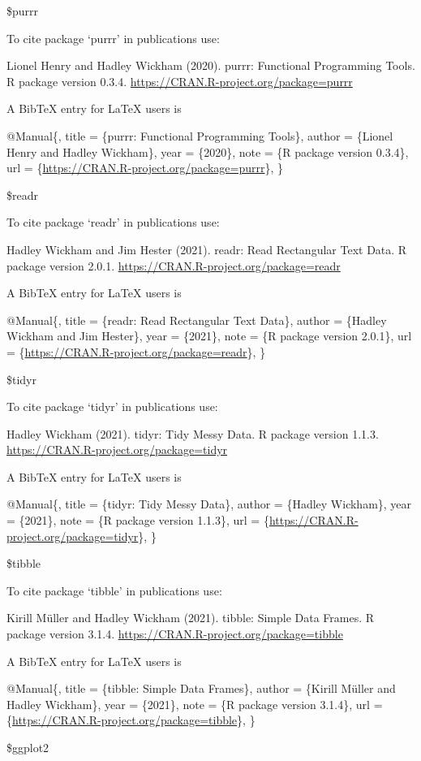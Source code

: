 \documentclass[
]{article}
\begin{document}
\$purrr

To cite package `purrr' in publications use:

Lionel Henry and Hadley Wickham (2020). purrr: Functional Programming
Tools. R package version 0.3.4.
\url{https://CRAN.R-project.org/package=purrr}

A BibTeX entry for LaTeX users is

@Manual\{, title = \{purrr: Functional Programming Tools\}, author =
\{Lionel Henry and Hadley Wickham\}, year = \{2020\}, note = \{R package
version 0.3.4\}, url =
\{\url{https://CRAN.R-project.org/package=purrr}\}, \}

\$readr

To cite package `readr' in publications use:

Hadley Wickham and Jim Hester (2021). readr: Read Rectangular Text Data.
R package version 2.0.1. \url{https://CRAN.R-project.org/package=readr}

A BibTeX entry for LaTeX users is

@Manual\{, title = \{readr: Read Rectangular Text Data\}, author =
\{Hadley Wickham and Jim Hester\}, year = \{2021\}, note = \{R package
version 2.0.1\}, url =
\{\url{https://CRAN.R-project.org/package=readr}\}, \}

\$tidyr

To cite package `tidyr' in publications use:

Hadley Wickham (2021). tidyr: Tidy Messy Data. R package version 1.1.3.
\url{https://CRAN.R-project.org/package=tidyr}

A BibTeX entry for LaTeX users is

@Manual\{, title = \{tidyr: Tidy Messy Data\}, author = \{Hadley
Wickham\}, year = \{2021\}, note = \{R package version 1.1.3\}, url =
\{\url{https://CRAN.R-project.org/package=tidyr}\}, \}

\$tibble

To cite package `tibble' in publications use:

Kirill Müller and Hadley Wickham (2021). tibble: Simple Data Frames. R
package version 3.1.4. \url{https://CRAN.R-project.org/package=tibble}

A BibTeX entry for LaTeX users is

@Manual\{, title = \{tibble: Simple Data Frames\}, author = \{Kirill
Müller and Hadley Wickham\}, year = \{2021\}, note = \{R package version
3.1.4\}, url = \{\url{https://CRAN.R-project.org/package=tibble}\}, \}

\$ggplot2
\end{document}

